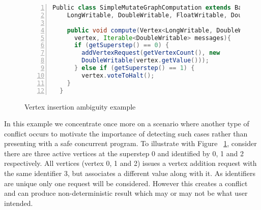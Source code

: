 \begin{figure}[h]
\begin{center}
\begin{lstlisting}[frame=tb, keywordstyle=\color{blue}, backgroundcolor=\color{white}, basicstyle=\footnotesize\ttfamily, language=Java, numbers=left, numberstyle=\tiny\color{black}]
  Public class SimpleMutateGraphComputation extends BasicComputation<
    LongWritable, DoubleWritable, FloatWritable, DoubleWritable> {

    public void compute(Vertex<LongWritable, DoubleWritable, FloatWritable>
      vertex, Iterable<DoubleWritable> messages){ 
      if (getSuperstep() == 0) {
      	addVertexRequest(getVertexCount(), new
      	DoubleWritable(vertex.getValue()));
      } else if (getSuperstep() == 1) {
        vertex.voteToHalt();
    } 
  }
\end{lstlisting}
\end{center}
\caption{Vertex insertion ambiguity example}
\label{fig:vInsert}
\end{figure}


In this example we concentrate once more on a scenario where another type of conflict occurs to motivate the importance of detecting such cases rather than presenting with a safe concurrent program. To illustrate with Figure ~\ref{fig:vInsert}, consider there are three active vertices at the superstep 0 and identified by 0, 1 and 2 respectively. All vertices (vertex 0, 1 and 2) issues a vertex addition request with the same identifier 3, but associates a different value along with it. As identifiers are unique only one request will be considered. However this creates a conflict and can produce non-deterministic result which may or may not be what user intended. 




